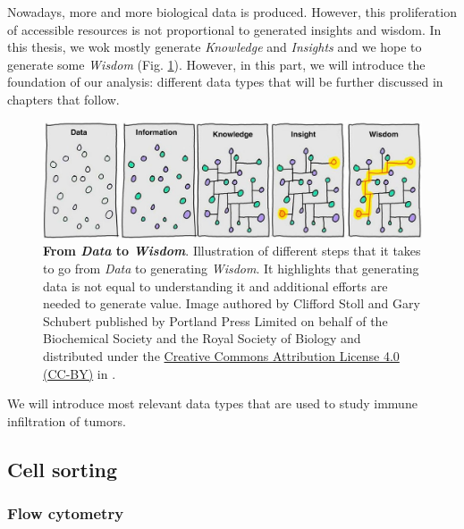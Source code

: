 \documentclass[12pt,]{book}
\theoremstyle{definition}
\theoremstyle{definition}
\theoremstyle{definition}
\theoremstyle{remark}
\begin{document}
Nowadays, more and more biological data is produced. However, this
proliferation of accessible resources is not proportional to generated
insights and wisdom. In this thesis, we wok mostly generate
\emph{Knowledge} and \emph{Insights} and we hope to generate some
\emph{Wisdom} (Fig. \ref{fig:information-power}). However, in this part,
we will introduce the foundation of our analysis: different data types
that will be further discussed in chapters that follow.

\begin{figure}

{\centering \includegraphics[width=0.8\linewidth]{figures-ext/01-Information_power} 

}

\caption{\textbf{From \emph{Data} to
\emph{Wisdom}}. Illustration of different steps that it takes to go from
\emph{Data} to generating \emph{Wisdom}. It highlights that generating
data is not equal to understanding it and additional efforts are needed
to generate value. Image authored by Clifford Stoll and Gary Schubert
published by Portland Press Limited on behalf of the Biochemical Society
and the Royal Society of Biology and distributed under the
\href{https://creativecommons.org/licenses/by/4.0/}{Creative Commons
Attribution License 4.0 (CC-BY)} in \citep{Ponting2017}.}\label{fig:information-power}
\end{figure}











We will introduce most relevant data types that are used to study immune
infiltration of tumors.

\hypertarget{facs}{%
\subsection{Cell sorting}\label{facs}}

\hypertarget{flow-cytometry}{%
\subsubsection{Flow cytometry}\label{flow-cytometry}}
\end{document}
